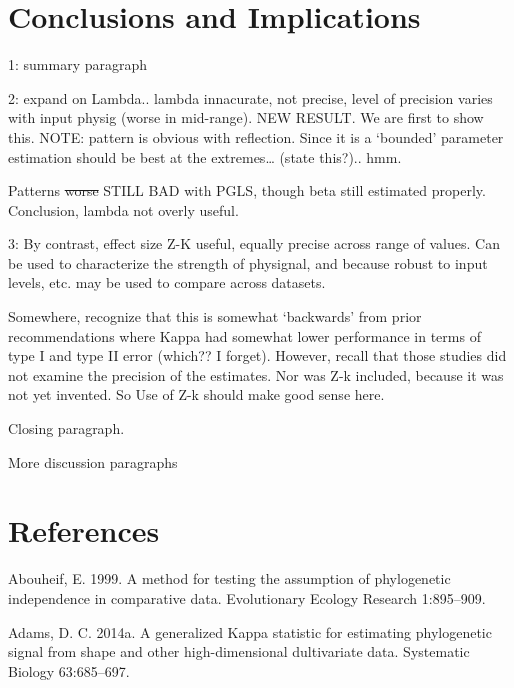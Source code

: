 \documentclass[
]{article}
\begin{document}
\hypertarget{conclusions-and-implications}{%
\section{Conclusions and
Implications}\label{conclusions-and-implications}}

1: summary paragraph

2: expand on Lambda.. lambda innacurate, not precise, level of precision
varies with input physig (worse in mid-range). NEW RESULT. We are first
to show this. NOTE: pattern is obvious with reflection. Since it is a
`bounded' parameter estimation should be best at the extremes\ldots{}
(state this?).. hmm.

Patterns \sout{worse} STILL BAD with PGLS, though beta still estimated
properly. Conclusion, lambda not overly useful.

3: By contrast, effect size Z-K useful, equally precise across range of
values. Can be used to characterize the strength of physignal, and
because robust to input levels, etc. may be used to compare across
datasets.

Somewhere, recognize that this is somewhat `backwards' from prior
recommendations where Kappa had somewhat lower performance in terms of
type I and type II error (which?? I forget). However, recall that those
studies did not examine the precision of the estimates. Nor was Z-k
included, because it was not yet invented. So Use of Z-k should make
good sense here.

Closing paragraph.

\hfill\break

More discussion paragraphs

\newpage

\hypertarget{references}{%
\section{References}\label{references}}

\setlength{\parindent}{-0.25in} \setlength{\leftskip}{0.25in}
\setlength{\parskip}{8pt} \noindent

\hypertarget{refs}{}
\leavevmode\hypertarget{ref-Abouheif1999}{}%
Abouheif, E. 1999. A method for testing the assumption of phylogenetic
independence in comparative data. Evolutionary Ecology Research
1:895--909.

\leavevmode\hypertarget{ref-Adams2014a}{}%
Adams, D. C. 2014a. A generalized Kappa statistic for estimating
phylogenetic signal from shape and other high-dimensional dultivariate
data. Systematic Biology 63:685--697.
\end{document}
